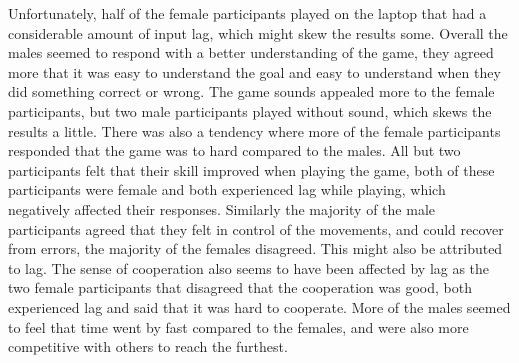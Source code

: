 Unfortunately, half of the female participants played on the laptop that had a considerable amount of input lag, which might skew the results some. Overall the males seemed to respond with a better understanding of the game, they agreed more that it was easy to understand the goal and easy to understand when they did something correct or wrong. The game sounds appealed more to the female participants, but two male participants played without sound, which skews the results a little. There was also a tendency where more of the female participants responded that the game was to hard compared to the males. All but two participants felt that their skill improved when playing the game, both of these participants were female and both experienced lag while playing, which negatively affected their responses. Similarly the majority of the male participants agreed that they felt in control of the movements, and could recover from errors, the majority of the females disagreed. This might also be attributed to lag. The sense of cooperation also seems to have been affected by lag as the two female participants that disagreed that the cooperation was good, both experienced lag and said that it was hard to cooperate. More of the males seemed to feel that time went by fast compared to the females, and were also more competitive with others to reach the furthest.


